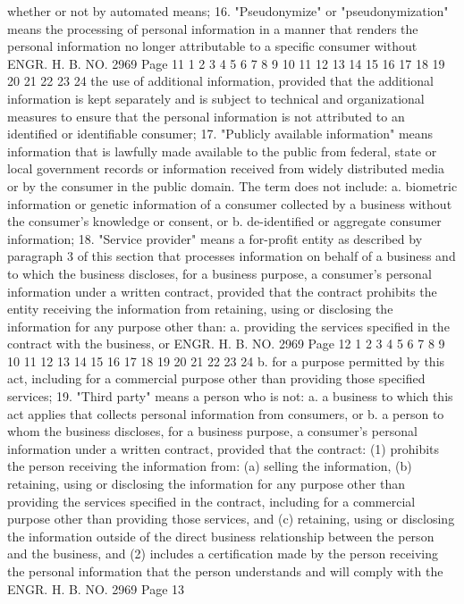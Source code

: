 whether or not by automated means;
16. "Pseudonymize" or "pseudonymization" means the processing
of personal information in a manner that renders the personal
information no longer attributable to a specific consumer without
ENGR. H. B. NO. 2969 Page 11
1
2
3
4
5
6
7
8
9
10
11
12
13
14
15
16
17
18
19
20
21
22
23
24
the use of additional information, provided that the additional
information is kept separately and is subject to technical and
organizational measures to ensure that the personal information is
not attributed to an identified or identifiable consumer;
17. "Publicly available information" means information that is
lawfully made available to the public from federal, state or local
government records or information received from widely distributed
media or by the consumer in the public domain. The term does not
include:
a. biometric information or genetic information of a
consumer collected by a business without the
consumer's knowledge or consent, or
b. de-identified or aggregate consumer information;
18. "Service provider" means a for-profit entity as described
by paragraph 3 of this section that processes information on behalf
of a business and to which the business discloses, for a business
purpose, a consumer's personal information under a written contract,
provided that the contract prohibits the entity receiving the
information from retaining, using or disclosing the information for
any purpose other than:
a. providing the services specified in the contract with
the business, or
ENGR. H. B. NO. 2969 Page 12
1
2
3
4
5
6
7
8
9
10
11
12
13
14
15
16
17
18
19
20
21
22
23
24
b. for a purpose permitted by this act, including for a
commercial purpose other than providing those
specified services;
19. "Third party" means a person who is not:
a. a business to which this act applies that collects
personal information from consumers, or
b. a person to whom the business discloses, for a
business purpose, a consumer's personal information
under a written contract, provided that the contract:
(1) prohibits the person receiving the information
from:
(a) selling the information,
(b) retaining, using or disclosing the
information for any purpose other than
providing the services specified in the
contract, including for a commercial purpose
other than providing those services, and
(c) retaining, using or disclosing the
information outside of the direct business
relationship between the person and the
business, and
(2) includes a certification made by the person
receiving the personal information that the
person understands and will comply with the 
ENGR. H. B. NO. 2969 Page 13
